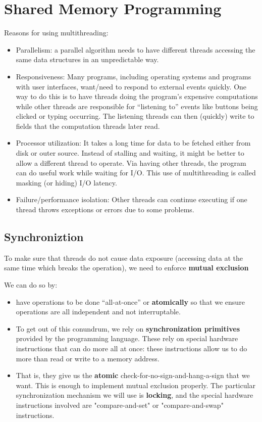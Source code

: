 \documentclass[letterpaper,12pt]{article}
\begin{document}
\section{Shared Memory Programming}
Reasons for using multithreading:
\begin{itemize}
      \item Parallelism: a parallel algorithm needs to have different threads accessing the same data structures in an unpredictable way.
      \item Responsiveness: Many programs, including operating systems and programs with user interfaces, want/need to respond to external events quickly. One way to do this is to have threads doing the program's expensive computations while other threads are responsible for ``listening to'' events like buttons being clicked or typing occurring. The listening threads can then (quickly) write to fields that the computation threads later read.
      \item Processor utilization: It takes a long time for data to be fetched either from disk or outer source. Instead of stalling and waiting, it might be better to allow a different thread to operate. Via having other threads, the program can do useful work while waiting for I/O. This use of multithreading is called masking (or hiding) I/O latency.
      \item Failure/performance isolation: Other threads can continue executing if one thread throws exceptions or errors due to some problems.
\end{itemize}

\subsection{Synchroniztion}
To make sure that threads do not cause data exposure (accessing data at the same time which breaks the operation), we need to enforce \textbf{mutual exclusion}

We can do so by:\begin{itemize}
      \item have operations to be done ``all-at-once'' or \textbf{atomically} so that we ensure operations are all independent and not interruptable. 
      \item To get out of this conundrum, we rely on \textbf{synchronization primitives} provided by the programming language. These rely on special hardware instructions that can do more all at once: these instructions allow us to do more than read or write to a memory address. 
      \item That is, they give us the \textbf{atomic} check-for-no-sign-and-hang-a-sign that we want. This is enough to implement mutual exclusion properly. The particular synchronization mechanism we will use is \textbf{locking}, and the special hardware instructions involved are "compare-and-set" or "compare-and-swap" instructions.
\end{itemize}
\end{document}
